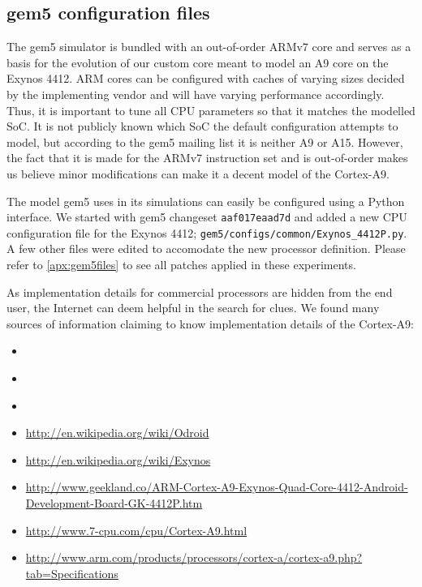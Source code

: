 \subsection{gem5 configuration files}
The gem5 simulator is bundled with an out-of-order ARMv7 core and serves as a
basis for the evolution of our custom core meant to model an A9 core on the
Exynos 4412. ARM cores can be configured with caches of varying sizes decided
by the implementing vendor and will have varying performance accordingly. Thus,
it is important to tune all CPU parameters so that it matches the modelled SoC.
It is not publicly known which SoC the default configuration attempts to model,
but according to the gem5 mailing list \cite{a15maillist} it is neither A9 or
A15. However, the fact that it is made for the ARMv7 instruction set and is
out-of-order makes us believe minor modifications can make it a decent model of
the Cortex-A9.

The model gem5 uses in its simulations can easily be configured using a Python
interface. We started with gem5 changeset \texttt{aaf017eaad7d} and added a new
CPU configuration file for the Exynos 4412;
\texttt{gem5/configs/common/Exynos\_4412P.py}. A few other files were edited to
accomodate the new processor definition. Please refer to
\autoref{apx:gem5files} to see all patches applied in these experiments.

As implementation details for commercial processors are hidden from the end
user, the Internet can deem helpful in the search for clues. We found many
sources of information claiming to know implementation details of the Cortex-A9:

\begin{itemize}
    \item{\cite{blem2013detailed}}
    \item{\cite{butko2012accuracy}}
    \item{\cite{armtech}}
    \item{\url{http://en.wikipedia.org/wiki/Odroid}}
    \item{\url{http://en.wikipedia.org/wiki/Exynos}}
    \item{\url{http://www.geekland.co/ARM-Cortex-A9-Exynos-Quad-Core-4412-Android-Development-Board-GK-4412P.htm}}
    \item{\url{http://www.7-cpu.com/cpu/Cortex-A9.html}}
    \item{\url{http://www.arm.com/products/processors/cortex-a/cortex-a9.php?tab=Specifications}}
\end{itemize}

